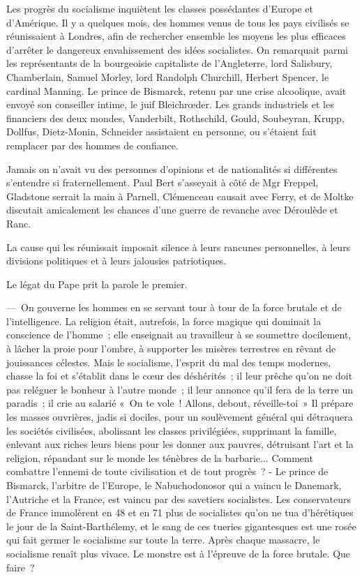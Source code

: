 \documentclass[french,twoside]{book} %
\begin{document}
\noindent Les progrès du socialisme inquiètent les classes possédantes d’Europe et d’Amérique. Il y a quelques mois, des hommes venus de tous les pays civilisés se réunissaient à Londres, afin de rechercher ensemble les moyens les plus efficaces d’arrêter le dangereux envahissement des idées socialistes. On remarquait parmi les représentants de la bourgeoisie capitaliste de l’Angleterre, lord Salisbury, Chamberlain, Samuel Morley, lord Randolph Churchill, Herbert Spencer, le cardinal Manning. Le prince de Bismarck, retenu par une crise alcoolique, avait envoyé son conseiller intime, le juif Bleichrœder. Les grands industriels et les financiers des deux mondes, Vanderbilt, Rothschild, Gould, Soubeyran, Krupp, Dollfus, Dietz-Monin, Schneider assistaient en personne, ou s’étaient fait remplacer par des hommes de confiance.\par
Jamais on n’avait vu des personnes d’opinions et de nationalités si différentes s’entendre si fraternellement. Paul Bert s’asseyait à côté de Mgr Freppel, Gladstone serrait la main à Parnell, Clémenceau causait avec Ferry, et de Moltke discutait amicalement les chances d’une guerre de revanche avec Déroulède et Ranc.\par
La cause qui les réunissait imposait silence à leurs rancunes personnelles, à leurs divisions politiques et à leurs jalousies patriotiques.\par
Le légat du Pape prit la parole le premier.\par
— On gouverne les hommes en se servant tour à tour de la force brutale et de l’intelligence. La religion était, autrefois, la force magique qui dominait la conscience de l’homme ; elle enseignait au travailleur à se soumettre docilement, à lâcher la proie pour l’ombre, à supporter les misères terrestres en rêvant de jouissances célestes. Mais le socialisme, l’esprit du mal des temps modernes, chasse la foi et s’établit dans le cœur des déshérités ; il leur prêche qu’on ne doit pas reléguer le bonheur à l’autre monde ; il leur annonce qu’il fera de la terre un paradis ; il crie au salarié « On te vole ! Allons, debout, réveille-toi » Il prépare les masses ouvrières, jadis si dociles, pour un soulèvement général qui détraquera les sociétés civilisées, abolissant les classes privilégiées, supprimant la famille, enlevant aux riches leurs biens pour les donner aux pauvres, détruisant l’art et la religion, répandant sur le monde les ténèbres de la barbarie... Comment combattre l’ennemi de toute civilisation et de tout progrès ? - Le prince de Bismarck, l’arbitre de l’Europe, le Nabuchodonosor qui a vaincu le Danemark, l’Autriche et la France, est vaincu par des savetiers socialistes. Les conservateurs de France immolèrent en 48 et en 71 plus de socialistes qu’on ne tua d’hérétiques le jour de la Saint-Barthélemy, et le sang de ces tueries gigantesques est une rosée qui fait germer le socialisme sur toute la terre. Après chaque massacre, le socialisme renaît plus vivace. Le monstre est à l’épreuve de la force brutale. Que faire ?\par
\end{document}
